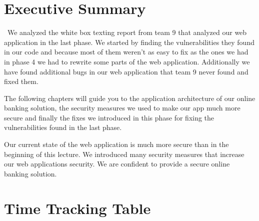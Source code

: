 \documentclass[headsepline,footsepline,footinclude=false,oneside,fontsize=11pt,paper=a4,listof=totoc,bibliography=totoc]{scrbook} %
\begin{document}


\frontmatter{}


{
	\chapter{Executive Summary}\
	We analyzed the white box texting report from team 9 that analyzed our web application in the last phase. We started by finding the vulnerabilities they found in our code and because most of them weren't as easy to fix as the ones we had in phase 4 we had to rewrite some parts of the web application. Additionally we have found additional bugs in our web application that team 9 never found and fixed them.
	
	The following chapters will guide you to the application architecture of our online banking solution, the security measures we used to make our app much more secure and finally the fixes we introduced in this phase for fixing the vulnerabilities found in the last phase.
	
	Our current state of the web application is much more secure than in the beginning of this lecture. We introduced many security measures that increase our web applications security. We are confident to provide a secure online banking solution.
}

\pagebreak
%
%
%
%
\tableofcontents{}
\mainmatter{}

\chapter{Time Tracking Table}
\end{document}
